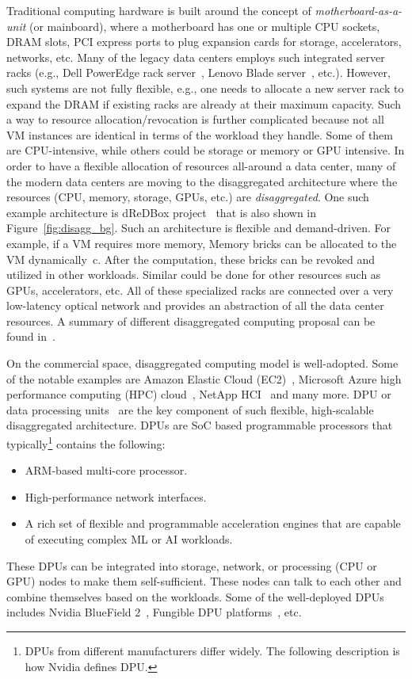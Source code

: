 Traditional computing hardware is built around the concept of \emph{motherboard-as-a-unit} (or mainboard), where a motherboard has one or multiple CPU sockets, DRAM slots, PCI express ports to plug expansion cards for storage, accelerators, networks, etc. Many of the legacy data centers employs such integrated server racks  (e.g., Dell PowerEdge rack server~\cite{rack_server_dell}, Lenovo Blade server~\cite{rack_server_lenovo}, etc.). However, such systems are not fully flexible, e.g., one needs to allocate a new server rack to expand the DRAM if existing racks are already at their maximum capacity. Such a way to resource allocation/revocation is further complicated because not all VM instances are identical in terms of the workload they handle. Some of them are CPU-intensive, while others could be storage or memory or GPU intensive. In order to have a flexible allocation of resources all-around a data center, many of the modern data centers are moving to the disaggregated architecture where the resources (CPU, memory, storage, GPUs, etc.) are \emph{disaggregated}. One such example architecture is dReDBox project~\cite{dis1,dis2} that is also shown in Figure~\ref{fig:disagg_bg}. Such an architecture is flexible and demand-driven. For example, if a VM requires more memory, Memory bricks can be allocated to the VM dynamically~c\cite{lim2009disaggregated}. After the computation, these bricks can be revoked and utilized in other workloads. Similar could be done for other resources such as GPUs, accelerators, etc. All of these specialized racks are connected over a very low-latency optical network and provides an abstraction of all the data center resources. A summary of different disaggregated computing proposal can be found in~\cite{meyer2017disaggregated}.

On the commercial space, disaggregated computing model is well-adopted. Some of the notable examples are Amazon Elastic Cloud (EC2)~\cite{ec2}, Microsoft Azure high performance computing (HPC) cloud~\cite{azure}, NetApp HCI~\cite{netapp} and many more. DPU or data processing units~\cite{dpu} are the key component of such flexible, high-scalable disaggregated architecture. DPUs are SoC based programmable processors that typically\footnote{DPUs from different manufacturers differ widely. The following description is how Nvidia defines DPU.} contains the following:

\begin{itemize}
  \item ARM-based multi-core processor.
  \item High-performance network interfaces. 
  \item A rich set of flexible and programmable acceleration engines that are capable of executing complex ML or AI workloads.
\end{itemize}

These DPUs can be integrated into storage, network, or processing (CPU or GPU) nodes to make them self-sufficient. These nodes can talk to each other and combine themselves based on the workloads. Some of the well-deployed DPUs includes Nvidia BlueField 2~\cite{bluefield}, Fungible DPU platforms~\cite{fungible}, etc.
